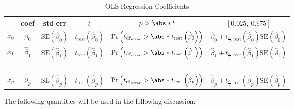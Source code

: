 \documentclass{article}
\begin{document}
\begin{table}[H]
    \centering
    \begin{tabular}{lccccc}
        \toprule
                & \textbf{coef}     & \textbf{std err}                            & \(t\)                                             & \(p > \abs*{t}\)                                                                                                & \(\left[0.025,\:  0.975 \right]\)                                                                                            \\ %
        \midrule
        \(x_0\) & \(\hat{\beta}_0\) & \(\mathrm{SE}\left( \hat{\beta}_0 \right)\) & \(t_{\mathrm{test}}\left( \hat{\beta}_0 \right)\) & \(\Pr{\left( t_{\mathrm{df}_{\mathrm{error}}} > \abs*{t_{\mathrm{test}}\left( \hat{\beta}_0 \right)} \right)}\) & \(\hat{\beta}_0 \pm t_{\frac{\alpha}{2},\mathrm{test}}\left( \hat{\beta}_0 \right) \mathrm{SE}\left( \hat{\beta}_0 \right)\) \\
        \(x_1\) & \(\hat{\beta}_1\) & \(\mathrm{SE}\left( \hat{\beta}_1 \right)\) & \(t_{\mathrm{test}}\left( \hat{\beta}_1 \right)\) & \(\Pr{\left( t_{\mathrm{df}_{\mathrm{error}}} > \abs*{t_{\mathrm{test}}\left( \hat{\beta}_1 \right)} \right)}\) & \(\hat{\beta}_1 \pm t_{\frac{\alpha}{2},\mathrm{test}}\left( \hat{\beta}_1 \right) \mathrm{SE}\left( \hat{\beta}_1 \right)\) \\
        \(\vdots\)                                                                                                                                                                                                                                                                                                                                                                     \\
        \(x_p\) & \(\hat{\beta}_p\) & \(\mathrm{SE}\left( \hat{\beta}_p \right)\) & \(t_{\mathrm{test}}\left( \hat{\beta}_p \right)\) & \(\Pr{\left( t_{\mathrm{df}_{\mathrm{error}}} > \abs*{t_{\mathrm{test}}\left( \hat{\beta}_p \right)} \right)}\) & \(\hat{\beta}_p \pm t_{\frac{\alpha}{2},\mathrm{test}}\left( \hat{\beta}_p \right) \mathrm{SE}\left( \hat{\beta}_p \right)\) \\
        \bottomrule
    \end{tabular}
    \caption{OLS Regression Coefficients} %
\end{table}
The following quantities will be used in the following discussion:
\end{document}
